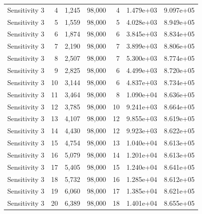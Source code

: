 \begin{table}
\begin{tabular}{lrrrrrr}
 Sensitivity 3 & 4 & 1,245 &  98,000 &   4 & 1.479e+03 & 9.097e+05 \\
 Sensitivity 3 & 5 & 1,559 &  98,000 &   5 & 4.028e+03 & 8.949e+05 \\
 Sensitivity 3 & 6 & 1,874 &  98,000 &   6 & 3.845e+03 & 8.834e+05 \\
 Sensitivity 3 & 7 & 2,190 &  98,000 &   7 & 3.899e+03 & 8.806e+05 \\
 Sensitivity 3 & 8 & 2,507 &  98,000 &   7 & 5.300e+03 & 8.774e+05 \\
 Sensitivity 3 & 9 & 2,825 &  98,000 &   6 & 4.499e+03 & 8.720e+05 \\
 Sensitivity 3 & 10 & 3,144 &  98,000 &   6 & 4.837e+03 & 8.734e+05 \\
 Sensitivity 3 & 11 & 3,464 &  98,000 &   8 & 1.090e+04 & 8.636e+05 \\
 Sensitivity 3 & 12 & 3,785 &  98,000 &   10 & 9.241e+03 & 8.664e+05 \\
 Sensitivity 3 & 13 & 4,107 &  98,000 &   12 & 9.855e+03 & 8.619e+05 \\
 Sensitivity 3 & 14 & 4,430 &  98,000 &   12 & 9.923e+03 & 8.622e+05 \\
 Sensitivity 3 & 15 & 4,754 &  98,000 &   13 & 1.040e+04 & 8.613e+05 \\
 Sensitivity 3 & 16 & 5,079 &  98,000 &   14 & 1.201e+04 & 8.613e+05 \\
 Sensitivity 3 & 17 & 5,405 &  98,000 &   15 & 1.240e+04 & 8.641e+05 \\
 Sensitivity 3 & 18 & 5,732 &  98,000 &   16 & 1.285e+04 & 8.612e+05 \\
 Sensitivity 3 & 19 & 6,060 &  98,000 &   17 & 1.385e+04 & 8.621e+05 \\
 Sensitivity 3 & 20 & 6,389 &  98,000 &   18 & 1.401e+04 & 8.655e+05 \\
 \bottomrule
 \end{tabular}
 \label{tab:aadh_h_state_selection}
\end{table}

